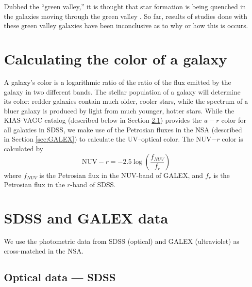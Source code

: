 Dubbed the ``green valley,'' it is thought that star formation 
is being quenched in the galaxies moving through the green valley 
\citep{Martin07}.  So far, results of studies done with these green valley 
galaxies have been inconclusive as to why or how this is occurs.




\section[Theory]{Calculating the color of a galaxy}

A galaxy's color is a logarithmic ratio of the ratio of the flux emitted by the 
galaxy in two different bands.  The stellar population of a galaxy will 
determine its color: redder galaxies contain much older, cooler stars, while the 
spectrum of a bluer galaxy is produced by light from much younger, hotter stars.  
While the KIAS-VAGC catalog (described below in Section \ref{sec:SDSS}) provides 
the $u-r$ color for all galaxies in SDSS, we make use of the Petrosian fluxes in 
the NSA (described in Section \ref{sec:GALEX}) to calculate the UV--optical 
color.  The NUV$-r$ color is calculated by
\begin{equation}
    \text{NUV}-r = -2.5\log \left( \frac{f_{NUV}}{f_r} \right)
\end{equation}
where $f_{NUV}$ is the Petrosian flux in the NUV-band of GALEX, and $f_r$ is the 
Petrosian flux in the $r$-band of SDSS.



\section[Data]{SDSS and GALEX data}

We use the photometric data from SDSS (optical) and GALEX (ultraviolet) as 
cross-matched in the NSA.

\subsection{Optical data --- SDSS}\label{sec:SDSS}

